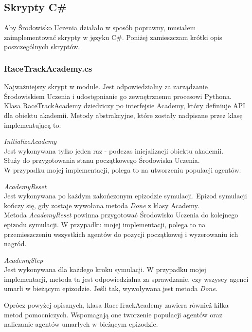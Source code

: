 \newpage
\subsection{Skrypty C\#}
Aby Środowisko Uczenia działało w sposób poprawny, musiałem zaimplementować skrypty w języku C\#. Poniżej zamieszczam krótki opis poszczególnych skryptów.
\subsubsection{RaceTrackAcademy.cs}
Najważniejszy skrypt w module. Jest odpowiedzialny za zarządzanie Środowiskiem Uczenia i udostępnianie go zewnętrznemu procesowi Pythona. \\
Klasa RaceTrackAcademy dziedziczy po interfejsie Academy, który definiuje API dla obiektu akademii.
Metody abstrakcyjne, które zostały nadpisane przez klasę implementującą to:
\begin{enumerate*}
\item \textit{InitializeAcademy} \\
Jest wykonywana tylko jeden raz - podczas inicjalizacji obiektu akademii. \\
Służy do przygotowania stanu początkowego Środowiska Uczenia. \\
W przypadku mojej implementacji, polega to na utworzeniu populacji agentów.
\item \textit{AcademyReset} \\
Jest wykonywana po każdym zakończonym epizodzie symulacji. Epizod symulacji kończy się, gdy zostaje wywołana metoda \textit{Done} z klasy Academy. \\
Metoda \textit{AcademyReset} powinna przygotować Środowisko Uczenia do kolejnego epizodu symulacji. W przypadku mojej implementacji, polega to na przemieszczeniu wszystkich agentów do pozycji początkowej i wyzerowaniu ich nagród.
\item \textit{AcademyStep} \\
Jest wykonywana dla każdego kroku symulacji. W przypadku mojej implementacji, metoda ta jest odpowiedzialna za sprawdzanie, czy wszyscy agenci umarli w bieżącym epizodzie. Jeśli tak, wywoływana jest metoda \textit{Done}.
\end{enumerate*}

Oprócz powyżej opisanych, klasa RaceTrackAcademy zawiera również kilka metod pomocniczych. Wspomagają one tworzenie populacji agentów oraz naliczanie agentów umarłych w bieżącym epizodzie.

